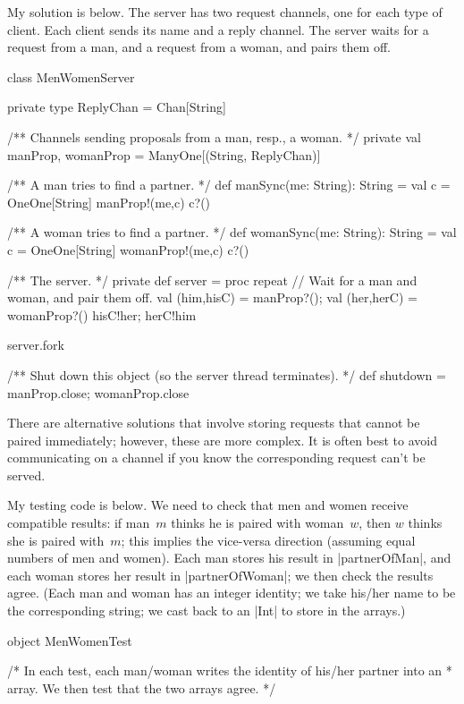 \begin{answer}
My solution is below.  The server has two request channels, one for each type
of client.  Each client sends its name and a reply channel.  The server waits
for a request from a man, and a request from a woman, and pairs them off.
%
\begin{scala}
class MenWomenServer{
  private type ReplyChan = Chan[String]

  /** Channels sending proposals from a man, resp., a woman. */
  private val manProp, womanProp = ManyOne[(String, ReplyChan)]

  /** A man tries to find a partner. */
  def manSync(me: String): String = {
    val c = OneOne[String]
    manProp!(me,c)
    c?()
  }

  /** A woman tries to find a partner. */
  def womanSync(me: String): String = {
    val c = OneOne[String]
    womanProp!(me,c)
    c?()
  }

  /** The server. */
  private def server = proc{
    repeat{
      // Wait for a man and woman, and pair them off. 
      val (him,hisC) = manProp?(); val (her,herC) = womanProp?()
      hisC!her; herC!him
    }
  }

  server.fork

  /** Shut down this object (so the server thread terminates). */
  def shutdown = { manProp.close; womanProp.close }
}
\end{scala}

There are alternative solutions that involve storing requests that cannot be
paired immediately; however, these are more complex.  It is often best to
avoid communicating on a channel if you know the corresponding request can't
be served. 

My testing code is below.  We need to check that men and women receive
compatible results: if man~$m$ thinks he is paired with woman~$w$, then $w$
thinks she is paired with~$m$; this implies the vice-versa direction (assuming
equal numbers of men and women).  Each man stores his result in
|partnerOfMan|, and each woman stores her result in |partnerOfWoman|; we then
check the results agree.  (Each man and woman has an integer identity; we take
his/her name to be the corresponding string; we cast back to an |Int| to store
in the arrays.)

\begin{scala}
object MenWomenTest{
  /* In each test, each man/woman writes the identity of his/her partner into an
   * array.  We then test that the two arrays agree. */

}
\end{scala}
\end{answer}
